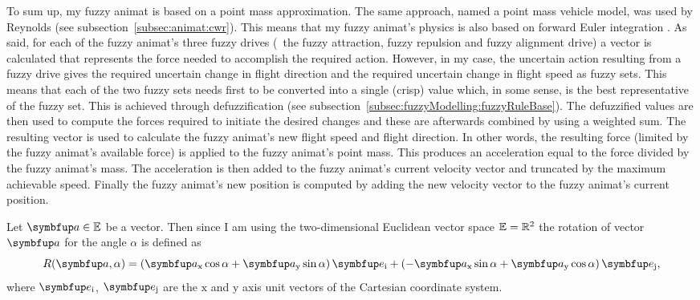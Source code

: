 To sum up, my fuzzy animat is based on a point mass approximation. The same approach, named a point mass vehicle model, was used by Reynolds \cite{reynolds:1987,reynolds:1999} (see subsection~\ref{subsec:animat:cwr}). This means that my fuzzy animat's physics is also based on forward Euler integration \cite{parent:2002,reynolds:1999}. As said, for each of the fuzzy animat's three fuzzy drives (\ie\ the fuzzy attraction, fuzzy repulsion and fuzzy alignment drive) a vector is calculated that represents the force needed to accomplish the required action. However, in my case, the uncertain action resulting from a fuzzy drive gives the required uncertain change in flight direction and the required uncertain change in flight speed as fuzzy sets. This means that each of the two fuzzy sets needs first to be converted into a single (crisp) value which, in some sense, is the best representative of the fuzzy set. This is achieved through defuzzification (see subsection~\ref{subsec:fuzzyModelling:fuzzyRuleBase}). The defuzzified values are then used to compute the forces required to initiate the desired changes and these are afterwards combined by using a weighted sum.  The resulting vector is used to calculate the fuzzy animat's new flight speed and flight direction. In other words, the resulting force (limited by the fuzzy animat's available force) is applied to the fuzzy animat's point mass. This produces an acceleration equal to the force divided by the fuzzy animat's mass. The acceleration is then added to the fuzzy animat's current velocity vector and truncated by the maximum achievable speed. Finally the fuzzy animat's new position is computed by adding the new velocity vector to the fuzzy animat's current position.

Let $\vect{a} \in \E$ be a vector. Then since I am using the two-dimensional Euclidean vector space $\mathbb{E}=\mathbb{R}^2$ the rotation of vector $\vect{a}$ for the angle $\alpha$ is defined as
%
\begin{equation}
  R(\vect{a}, \alpha) = \left(\vect{a}_\textnormal{x}\cos\alpha + \vect{a}_\textnormal{y}\sin\alpha\right)\vect{e}_\textnormal{i} + \left(-\vect{a}_\textnormal{x}\sin\alpha + \vect{a}_\textnormal{y}\cos\alpha\right)\vect{e}_\textnormal{j},
\end{equation}
%
where $\vect{e}_\textnormal{i}$, $\vect{e}_\textnormal{j}$ are the $\mathrm{x}$ and $\mathrm{y}$ axis unit vectors of the Cartesian coordinate system.

